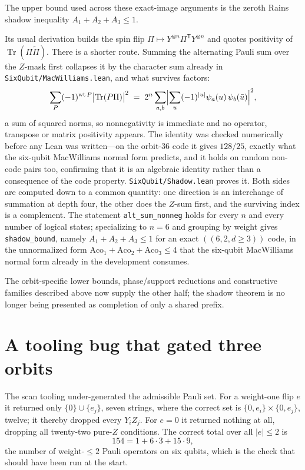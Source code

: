 \documentclass[11pt,a4paper]{article}
\newcommand{\lean}[1]{\texttt{#1}}
\theoremstyle{definition}
\begin{document}
The upper bound used across these exact-image arguments is the zeroth Rains
shadow inequality $A_1+A_2+A_3\le1$.

Its usual derivation builds the spin flip
$\Pi\mapsto Y^{\otimes n}\Pi^{\mathsf T}Y^{\otimes n}$ and quotes positivity of
$\operatorname{Tr}(\Pi\widetilde\Pi)$. There is a shorter route. Summing the
alternating Pauli sum over the $Z$-mask first collapses it by the character sum
already in \lean{SixQubit/MacWilliams.lean}, and what survives factors:
\[
  \sum_{P}(-1)^{\mathrm{wt}\,P}\bigl|\operatorname{Tr}(P\Pi)\bigr|^2
  \;=\;
  2^{n}\sum_{a,b}\Bigl|\sum_{u}(-1)^{|u|}\psi_a(u)\,\psi_b(\bar u)\Bigr|^{2},
\]
a sum of squared norms, so nonnegativity is immediate and no operator,
transpose or matrix positivity appears. The identity was checked numerically
before any Lean was written---on the orbit-36 code it gives $128/25$, exactly
what the six-qubit MacWilliams normal form predicts, and it holds on random
non-code pairs too, confirming that it is an algebraic identity rather than a
consequence of the code property. \lean{SixQubit/Shadow.lean} proves it. Both sides are
computed down to a common quantity: one direction is an interchange of
summation at depth four, the other does the $Z$-sum first, and the surviving
index is a complement. The statement
\lean{alt\_sum\_nonneg} holds for every $n$ and every number of
logical states; specializing to $n=6$ and grouping by weight gives
\lean{shadow\_bound}, namely $A_1+A_2+A_3\le1$ for an exact
$((6,2,d\ge3))$ code, in the unnormalized form
$\mathrm{Aco}_1+\mathrm{Aco}_2+\mathrm{Aco}_3\le4$ that the six-qubit
MacWilliams normal form already in the development consumes.

The orbit-specific lower bounds, phase/support reductions and constructive
families described above now supply the other half; the shadow theorem is no
longer being presented as completion of only a shared prefix.

\section{A tooling bug that gated three orbits}
\label{sec:bug}

The scan tooling under-generated the admissible Pauli set. For a weight-one flip
$e$ it returned only $\{0\} \cup \{e_j\}$, seven strings, where the correct set
is $\{0, e_i\} \times \{0, e_j\}$, twelve; it thereby dropped every $Y_i Z_j$. For
$e = 0$ it returned nothing at all, dropping all twenty-two pure-$Z$ conditions.
The correct total over all $|e| \le 2$ is
\[
  154 = 1 + 6 \cdot 3 + 15 \cdot 9 ,
\]
the number of weight-$\le 2$ Pauli operators on six qubits, which is the check
that should have been run at the start.
\end{document}
